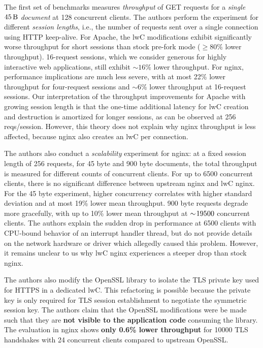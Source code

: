 \documentclass[10pt,twocolumn,a4paper]{article}
\begin{document}
The first set of benchmarks measures \textit{throughput} of GET requests for a \textit{single $\SI{45}{\byte}$ document} at 128 concurrent clients.
The authors perform the experiment for different \textit{session lengths}, i.e., the number of requests sent over a single connection using HTTP keep-alive.
For Apache, the lwC modifications exhibit significantly worse throughput for short sessions than stock pre-fork mode ($\ge80\%$ lower throughput).
16-request sessions, which we consider generous for highly interactive web applications, still exhibit $\sim 16\%$ lower throughput.
For nginx, performance implications are much less severe, with at most 22\% lower throughput for four-request sessions and $\sim 6\%$ lower throughput at 16-request sessions.
\cite{lwcpaper}
Our interpretation of the throughput improvements for Apache with growing session length is that the one-time additional latency for lwC creation and destruction is amortized for longer sessions, as can be observed at 256 reqs/session.
However, this theory does not explain why nginx throughput is less affected, because nginx also creates an lwC per connection.

The authors also conduct a \textit{scalability} experiment for nginx:
at a fixed session length of 256 requests, for 45 byte and 900 byte documents, the total throughput is measured for different counts of concurrent clients.
For up to 6500 concurrent clients, there is no significant difference between upstream nginx and lwC nginx.
For the 45 byte experiment, higher concurrency correlates with higher standard deviation and at most 19\% lower mean throughput.
900 byte requests degrade more gracefully, with up to 10\% lower mean throughput at $\sim\hspace{-2pt}19500$ concurrent clients.
The authors explain the sudden drop in performance at 6500 clients with CPU-bound behavior of an interrupt handler thread, but do not provide details on the network hardware or driver which allegedly caused this problem.
\cite{lwcpaper}
However, it remains unclear to us why lwC nginx experiences a steeper drop than stock nginx.

The authors also modify the OpenSSL library to isolate the TLS private key used for HTTPS in a dedicated lwC.
This refactoring is possible because the private key is only required for TLS session establishment to negotiate the symmetric session key.
The authors claim that the OpenSSL modifications were be made such that they are \textbf{not visible to the application code} consuming the library.
The evaluation in nginx shows \textbf{only 0.6\% lower throughput} for 10000 TLS handshakes with 24 concurrent clients compared to upstream OpenSSL.
\cite{lwcpaper}
\end{document}
